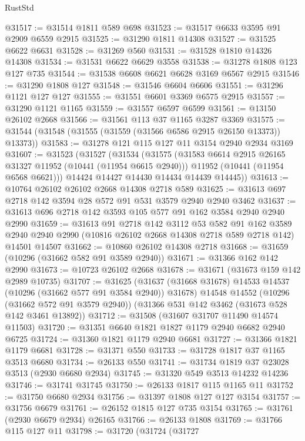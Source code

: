 \begin{lexlean}{RustStd}
\begin{coremodule}
@31517 := @31514 @1811 @589 @698
@31523 := @31517 @6633 @3595 @91 @2909 @6559 @2915
@31525 := @31290 @1811 @14308
@31527 := @31525 @6622 @6631
@31528 := @31269 @560
@31531 := @31528 @1810 @14326 @14308
@31534 := @31531 @6622 @6629 @3558
@31538 := @31278 @1808 @123 @127 @735
@31544 := @31538 @6608 @6621 @6628 @3169 @6567 @2915
@31546 := @31290 @1808 @127
@31548 := @31546 @6604 @6606
@31551 := @31296 @1121 @127 @127
@31555 := @31551 @6601 @3369 @6575 @2915
@31557 := @31290 @1121 @1165
@31559 := @31557 @6597 @6599
@31561 := @13150 @26102 @2668
@31566 := @31561 @113 @37 @1165 @3287 @3369
@31575 := @31544 (@31548 (@31555 (@31559 (@31566 @6586 @2915 @26150 @13373)) @13373))
@31583 := @31278 @121 @115 @127 @11 @3154 @2940 @2934 @3169
@31607 := @31523
    (@31527
      (@31534
        (@31575
          (@31583 @6614 @2915 @26165 @31327 @11952 (@10441 (@11954 @6615 @2940)))
          @11952
          (@10441 (@11954 @6568 @6621)))
        @14424
        @14427
        @14430
        @14434
        @14439
        @14445))
@31613 := @10764 @26102 @26102 @2668 @14308 @2718 @589
@31625 := @31613 @697 @2718 @142 @3594 @28 @572 @91 @531 @3579 @2940 @2940 @3462
@31637 := @31613 @696 @2718 @142 @3593 @105 @577 @91 @162 @3584 @2940 @2940 @2990
@31659 := @31613
    @91
    @2718
    @142
    @3112
    @53
    @582
    @91
    @162
    @3589
    @2940
    @2940
    @2990
    (@10816 @26102 @2668 @14308 @2718 @589 @2718 @142)
    @14501
    @14507
@31662 := @10860 @26102 @14308 @2718
@31668 := @31659 (@10296 (@31662 @582 @91 @3589 @2940))
@31671 := @31366 @162 @142 @2990
@31673 := @10723 @26102 @2668
@31678 := @31671 (@31673 @159 @142 @2989 @10735)
@31707 := @31625
    (@31637 (@31668 @31678) @14533 @14537 (@10296 (@31662 @577 @91 @3584 @2940)) @31678)
    @14548
    @14552
    (@10296 (@31662 @572 @91 @3579 @2940))
    (@31366 @531 @142 @3462 (@31673 @528 @142 @3461 @13892))
@31712 := @31508 (@31607 @31707 @11490 @14574 @11503)
@31720 := @31351 @6640 @1821 @1827 @1179 @2940 @6682 @2940 @6725
@31724 := @31360 @1821 @1179 @2940 @6681
@31727 := @31366 @1821 @1179 @6681
@31728 := @31371 @550
@31733 := @31728 @1817 @37 @1165 @3513 @6680
@31734 := @26133 @550
@31741 := @31734 @1819 @37 @23028 @3513 (@2930 @6680 @2934)
@31745 := @31320 @549 @3513 @14232 @14236
@31746 := @31741 @31745
@31750 := @26133 @1817 @115 @1165 @11
@31752 := @31750 @6680 @2934
@31756 := @31397 @1808 @127 @127 @3154
@31757 := @31756 @6679
@31761 := @26152 @1815 @127 @735 @3154
@31765 := @31761 (@2930 @6679 @2934) @26165
@31766 := @26133 @1808
@31769 := @31766 @115 @127 @11
@31798 := @31720
    (@31724
      (@31727

\end{coremodule}
\end{lexlean}
